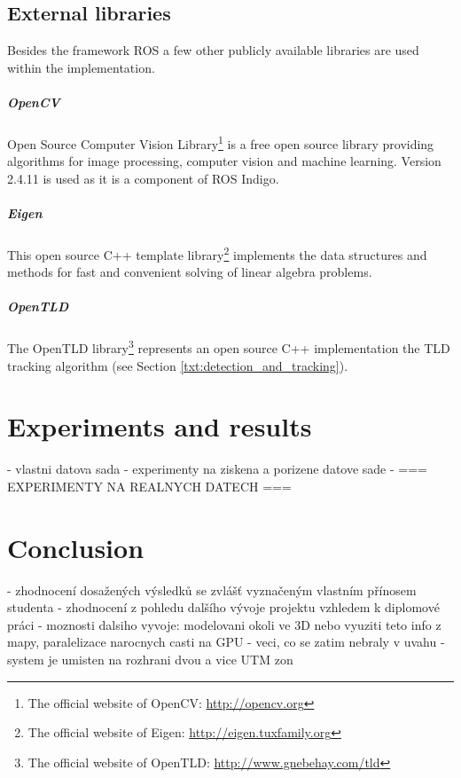 \section{External libraries} \label{txt:external_libraries}

Besides the framework ROS a few other publicly available libraries are used within the implementation.

\paragraph{OpenCV} Open Source Computer Vision Library\footnote{The official website of OpenCV: \url{http://opencv.org}} is a free open source library providing algorithms for image processing, computer vision and machine learning. Version 2.4.11 is used as it is a component of ROS Indigo.

\paragraph{Eigen} This open source C++ template library\footnote{The official website of Eigen: \url{http://eigen.tuxfamily.org}} implements the data structures and methods for fast and convenient solving of linear algebra problems.

\paragraph{OpenTLD} The OpenTLD library\footnote{The official website of OpenTLD: \url{http://www.gnebehay.com/tld}} represents an open source C++ implementation the TLD tracking algorithm (see Section \ref{txt:detection_and_tracking}).	



\chapter{Experiments and results}

- vlastni datova sada
- experimenty na ziskena a porizene datove sade
- === EXPERIMENTY NA REALNYCH DATECH ===

\chapter{Conclusion}

- zhodnocení dosažených výsledků se zvlášť vyznačeným vlastním přínosem studenta
- zhodnocení z pohledu dalšího vývoje projektu vzhledem k diplomové práci
- moznosti dalsiho vyvoje: modelovani okoli ve 3D nebo vyuziti teto info z mapy, paralelizace narocnych casti na GPU
- veci, co se zatim nebraly v uvahu
	- system je umisten na rozhrani dvou a vice UTM zon


